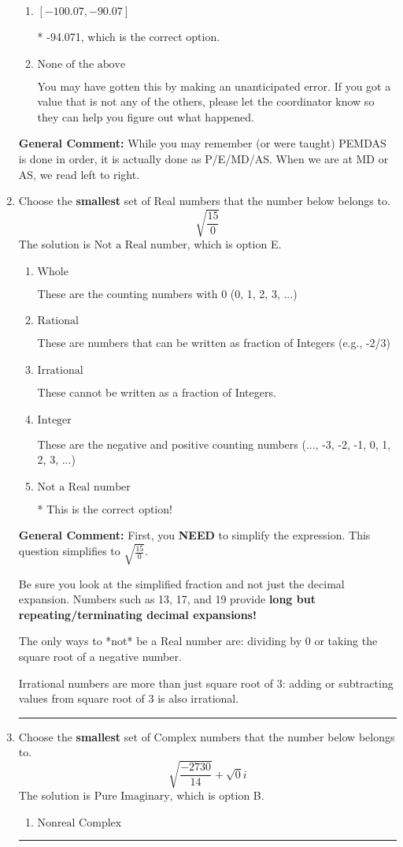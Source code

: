 \documentclass{extbook}[14pt]
\newcommand{\litem}[1]{\item #1

\rule{\textwidth}{0.4pt}}
\begin{document}
\begin{enumerate}
{\begin{enumerate}[label=\Alph*.]
 96.936, which corresponds to not distributing addition and subtraction correctly.
\item \( [-100.07, -90.07] \)

* -94.071, which is the correct option.
\item \( \text{None of the above} \)

 You may have gotten this by making an unanticipated error. If you got a value that is not any of the others, please let the coordinator know so they can help you figure out what happened.
\end{enumerate}

\textbf{General Comment:} While you may remember (or were taught) PEMDAS is done in order, it is actually done as P/E/MD/AS. When we are at MD or AS, we read left to right.
}
\litem{
Choose the \textbf{smallest} set of Real numbers that the number below belongs to.
\[ \sqrt{\frac{15}{0}} \]The solution is \( \text{Not a Real number} \), which is option E.\begin{enumerate}[label=\Alph*.]
\item \( \text{Whole} \)

These are the counting numbers with 0 (0, 1, 2, 3, ...)
\item \( \text{Rational} \)

These are numbers that can be written as fraction of Integers (e.g., -2/3)
\item \( \text{Irrational} \)

These cannot be written as a fraction of Integers.
\item \( \text{Integer} \)

These are the negative and positive counting numbers (..., -3, -2, -1, 0, 1, 2, 3, ...)
\item \( \text{Not a Real number} \)

* This is the correct option!
\end{enumerate}

\textbf{General Comment:} First, you \textbf{NEED} to simplify the expression. This question simplifies to $\sqrt{\frac{15}{0}}$. 
 
 Be sure you look at the simplified fraction and not just the decimal expansion. Numbers such as 13, 17, and 19 provide \textbf{long but repeating/terminating decimal expansions!} 
 
 The only ways to *not* be a Real number are: dividing by 0 or taking the square root of a negative number. 
 
 Irrational numbers are more than just square root of 3: adding or subtracting values from square root of 3 is also irrational.
}
\litem{
Choose the \textbf{smallest} set of Complex numbers that the number below belongs to.
\[ \sqrt{\frac{-2730}{14}}+\sqrt{0}i \]The solution is \( \text{Pure Imaginary} \), which is option B.\begin{enumerate}[label=\Alph*.]
\item \( \text{Nonreal Complex} \)


\end{enumerate}}
\end{enumerate}
\end{document}
